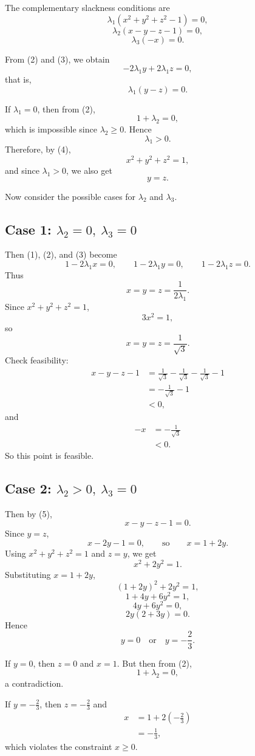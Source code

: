 The complementary slackness conditions are
\[
\lambda_1(x^2+y^2+z^2-1)=0, \tag{4}
\]
\[
\lambda_2(x-y-z-1)=0, \tag{5}
\]
\[
\lambda_3(-x)=0. \tag{6}
\]

From (2) and (3), we obtain
\[
-2\lambda_1 y+2\lambda_1 z=0,
\]
that is,
\[
\lambda_1(y-z)=0.
\]

If \(\lambda_1=0\), then from (2),
\[
1+\lambda_2=0,
\]
which is impossible since \(\lambda_2\ge 0\). Hence
\[
\lambda_1>0.
\]
Therefore, by (4),
\[
x^2+y^2+z^2=1,
\]
and since \(\lambda_1>0\), we also get
\[
y=z.
\]

Now consider the possible cases for \(\lambda_2\) and \(\lambda_3\).

\subsection*{Case 1: \(\lambda_2=0,\ \lambda_3=0\)}

Then (1), (2), and (3) become
\[
1-2\lambda_1 x=0,\qquad
1-2\lambda_1 y=0,\qquad
1-2\lambda_1 z=0.
\]
Thus
\[
x=y=z=\frac{1}{2\lambda_1}.
\]
Since \(x^2+y^2+z^2=1\),
\[
3x^2=1,
\]
so
\[
x=y=z=\frac{1}{\sqrt{3}}.
\]
Check feasibility:
\[
\begin{aligned}
x-y-z-1
&=
\frac1{\sqrt3}-\frac1{\sqrt3}-\frac1{\sqrt3}-1\\
&=
-\frac1{\sqrt3}-1\\
&<0,
\end{aligned}
\]
and
\[
\begin{aligned}
-x
&=-\frac1{\sqrt3}\\
&<0.
\end{aligned}
\]
So this point is feasible.

\subsection*{Case 2: \(\lambda_2>0,\ \lambda_3=0\)}

Then by (5),
\[
x-y-z-1=0.
\]
Since \(y=z\),
\[
x-2y-1=0,
\qquad\text{so}\qquad
x=1+2y.
\]
Using \(x^2+y^2+z^2=1\) and \(z=y\), we get
\[
x^2+2y^2=1.
\]
Substituting \(x=1+2y\),
\[
(1+2y)^2+2y^2=1,
\]
\[
1+4y+6y^2=1,
\]
\[
4y+6y^2=0,
\]
\[
2y(2+3y)=0.
\]
Hence
\[
y=0 \quad\text{or}\quad y=-\frac23.
\]

If \(y=0\), then \(z=0\) and \(x=1\). But then from (2),
\[
1+\lambda_2=0,
\]
a contradiction.

If \(y=-\frac23\), then \(z=-\frac23\) and
\[
\begin{aligned}
x
&=1+2\left(-\frac23\right)\\
&=-\frac13,
\end{aligned}
\]
which violates the constraint \(x\ge 0\).

